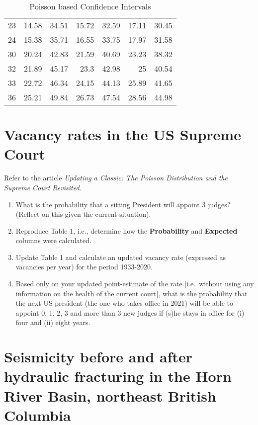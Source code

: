 \documentclass[letterpaper,11pt,twoside,]{pinp}
\begin{document}
\begin{table}[h]
\begin{center}
\begin{tabular}{|r|rr|rr|rr|}
23 & 14.58 & 34.51 & 15.72 & 32.59 & 17.11 & 30.45 \\
24 & 15.38 & 35.71 & 16.55 & 33.75 & 17.97 & 31.58 \\
30 & 20.24 & 42.83 & 21.59 & 40.69 & 23.23 & 38.32\\
32 & 21.89 & 45.17 & 23.3 & 42.98 & 25 & 40.54\\
33 & 22.72 & 46.34 & 24.15 & 44.13 & 25.89 & 41.65\\
36 & 25.21 & 49.84 & 26.73 & 47.54 & 28.56 & 44.98\\
\hline
\end{tabular}
\end{center}
\caption{Poisson based Confidence Intervals}
\end{table}

\hypertarget{vacancy-rates-in-the-us-supreme-court}{%
\section{Vacancy rates in the US Supreme
Court}\label{vacancy-rates-in-the-us-supreme-court}}

Refer to the article \emph{Updating a Classic: The Poisson Distribution
and the Supreme Court Revisited}.

\begin{enumerate}
\def\labelenumi{\alph{enumi})}
\item
  What is the probability that a sitting President will appoint 3
  judges? (Reflect on this given the current situation).
\item
  Reproduce Table 1, i.e., determine how the \textbf{Probability} and
  \textbf{Expected} columns were calculated.
\item
  Update Table 1 and calculate an updated vacancy rate (expressed as
  vacancies per year) for the period 1933-2020.
\item
  Based only on your updated point-estimate of the rate {[}i.e.~without
  using any information on the health of the current court{]}, what is
  the probability that the next US president (the one who takes office
  in 2021) will be able to appoint 0, 1, 2, 3 and more than 3 new judges
  if (s)he stays in office for (i) four and (ii) eight years.
\end{enumerate}

\hypertarget{seismicity-before-and-after-hydraulic-fracturing-in-the-horn-river-basin-northeast-british-columbia}{%
\section{Seismicity before and after hydraulic fracturing in the Horn
River Basin, northeast British
Columbia}\label{seismicity-before-and-after-hydraulic-fracturing-in-the-horn-river-basin-northeast-british-columbia}}
\end{document}
